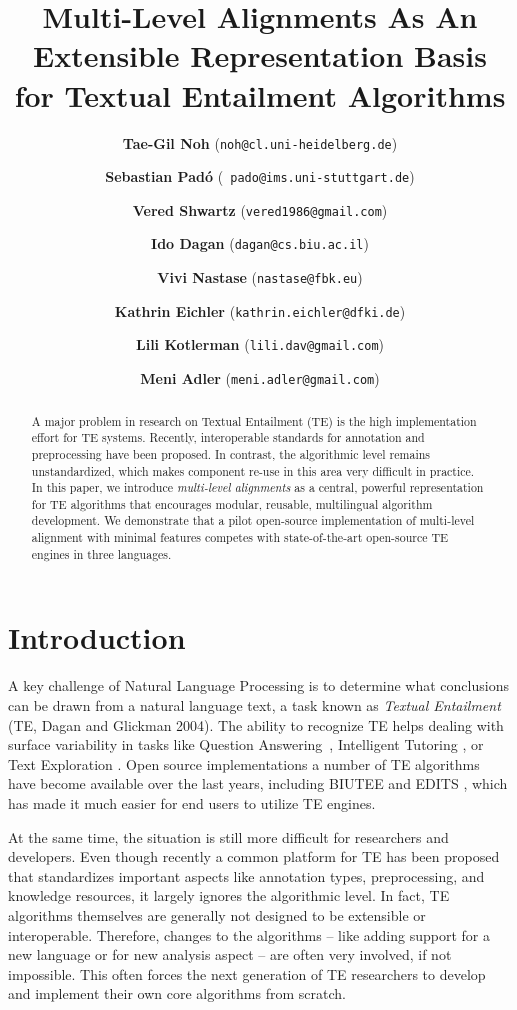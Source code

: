 \documentclass[11pt,letterpaper]{article}
\title{Multi-Level Alignments As An Extensible Representation Basis \\
  for Textual Entailment Algorithms}
\author[1]{\textbf{Tae-Gil Noh} (\texttt{\small noh@cl.uni-heidelberg.de})}
\author[2]{\textbf{Sebastian Pad{\'o}} (\texttt{\small
     pado@ims.uni-stuttgart.de})}
\author[3]{\authorcr \textbf{Vered Shwartz} (\texttt{\small vered1986@gmail.com})}
\author[3]{\textbf{Ido Dagan} (\texttt{\small dagan@cs.biu.ac.il})}
\author[4]{\authorcr \textbf{Vivi Nastase} (\texttt{\small nastase@fbk.eu})} %
\author[5]{\textbf{Kathrin Eichler} (\texttt{\small kathrin.eichler@dfki.de})}
\author[3]{\authorcr \textbf{Lili Kotlerman} (\texttt{\small lili.dav@gmail.com})}
\author[3]{\textbf{Meni Adler} (\texttt{\small meni.adler@gmail.com})}
\affil[1]{Institute of Computational Linguistics, Heidelberg University, Germany}
\affil[2]{Institute of Natural Language Processing, Stuttgart University, Germany}
\affil[3]{Department of Computer Science, Bar-Ilan University, Israel}
\affil[4]{Human Language Technology, Fondazione Bruno Kessler, Italy}
\affil[5]{Language Technology Lab, DFKI GmbH, Germany}
\date{}
\begin{document}
\maketitle
\begin{abstract}
  A major problem in research on Textual Entailment (TE) is the high
  implementation effort for TE systems. Recently, interoperable
  standards for annotation and preprocessing have been proposed. In
  contrast, the algorithmic level remains unstandardized, which
  makes component re-use in this area very difficult in
  practice.
%
%
%
  In this paper, we introduce {\em multi-level alignments} as a
  central, powerful representation for TE algorithms that encourages
  modular, reusable, multilingual algorithm development.
  We demonstrate that a pilot open-source implementation of
  multi-level alignment with minimal features competes with
  state-of-the-art open-source TE engines in three languages.
\end{abstract}

\section{Introduction}
A key challenge of Natural Language Processing is to determine what
conclusions can be drawn from a natural language text, a task known as
\textit{Textual Entailment} (TE, Dagan and Glickman
2004).\nocite{dagan04:_probab_textual_entail} The ability to recognize
TE helps dealing with surface variability in tasks like Question
Answering~\cite{harabagiu-hickl:2006:COLACL}, Intelligent Tutoring
\cite{nielsen09:_recog_entail_in_intel_tutor_system}, or Text
Exploration \cite{berant2012learning}. Open source implementations a
number of TE algorithms have become available over the last years,
including BIUTEE \cite{Stern:2012} and EDITS \cite{Kouylekov:2010},
which has made it much easier for end users to utilize TE engines.

At the same time, the situation is still more difficult for
researchers and developers. Even though recently a common platform for
TE has been proposed \cite{EOP-arch} that standardizes important
aspects like annotation types, preprocessing, and knowledge resources,
it largely ignores the algorithmic level. In fact, TE algorithms
themselves are generally not designed to be extensible or
interoperable. Therefore, changes to the algorithms -- like adding
support for a new language or for new analysis aspect -- are often
very involved, if not impossible. This often forces the next
generation of TE researchers to develop and implement their own core
algorithms from scratch.
\end{document}
